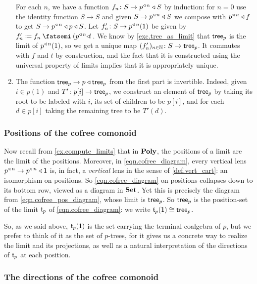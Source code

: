 \documentclass[Book-Poly]{subfiles}
\begin{document}
\begin{exercise}
\begin{solution}
\begin{enumerate}
	For each $n$, we have a function $f_n\colon S\to p^{\mathbin{\triangleleft}\,n}\mathbin{\triangleleft} S$ by induction: for $n=0$ use the identity function $S\to S$ and given $S\to p^{\mathbin{\triangleleft}\,n}\mathbin{\triangleleft} S$ we compose with $p^{\mathbin{\triangleleft}\,n}\mathbin{\triangleleft} f$ to get $S\to p^{\mathbin{\triangleleft}\,n}\mathbin{\triangleleft} p\mathbin{\triangleleft} S$. Let $f_n'\colon S\to p^{\mathbin{\triangleleft}\,n}(1)$ be given by $f_n'\coloneqq f_n\then(p\tripow{n}\tri!$. We know by \cref{exc.tree_as_limit} that $\mathsf{tree}_p$ is the limit of $p^{\mathbin{\triangleleft}\,n}(1)$, so we get a unique map $(f_n')_{n\in\mathbb{N}}\colon S\to\mathsf{tree}_p$. It commutes with $f$ and $t$ by construction, and the fact that it is constructed using the universal property of limits implies that it is appropriately unique.
		\item The function $\mathsf{tree}_p\to p\mathbin{\triangleleft}\mathsf{tree}_p$ from the first part is invertible. Indeed, given $i\in p(1)$ and $T'\colon p[i]\to\mathsf{tree}_p$, we construct an element of $\mathsf{tree}_p$ by taking its root to be labeled with $i$, its set of children to be $p[i]$, and for each $d\in p[i]$ taking the remaining tree to be $T'(d)$.
\end{enumerate}
\end{solution}
\end{exercise}

\subsubsection{Positions of the cofree comonoid}

Now recall from \cref{ex.compute_limits} that in $\mathbf{Poly}$, the positions of a limit are the limit of the positions.
Moreover, in \eqref{eqn.cofree_diagram}, every vertical lens $p^{\mathbin{\triangleleft}\,n}\to p^{\mathbin{\triangleleft}\,n}\mathbin{\triangleleft}\textsf{1}$ is, in fact, a \emph{vertical} lens in the sense of \cref{def.vert_cart}: an isomorphism on positions.
So \eqref{eqn.cofree_diagram} on positions collapses down to its bottom row, viewed as a diagram in $\mathbf{Set}$.
Yet this is precisely the diagram from \eqref{eqn.cofree_pos_diagram}, whose limit is $\mathsf{tree}_p$.
So $\mathsf{tree}_p$ is the position-set of the limit $\mathfrak{t}_p$ of \eqref{eqn.cofree_diagram}: we write $\mathfrak{t}_p(\textsf{1})\cong\mathsf{tree}_p$.

So, as we said above, $\mathfrak{t}_p(\textsf{1})$ is the set carrying the terminal coalgebra of $p$, but  we prefer to think of it as the set of $p$-trees, for it gives us a concrete way to realize the limit and its projections, as well as a natural interpretation of the directions of $\mathfrak{t}_p$ at each position.

\subsubsection{The directions of the cofree comonoid}
\end{document}

